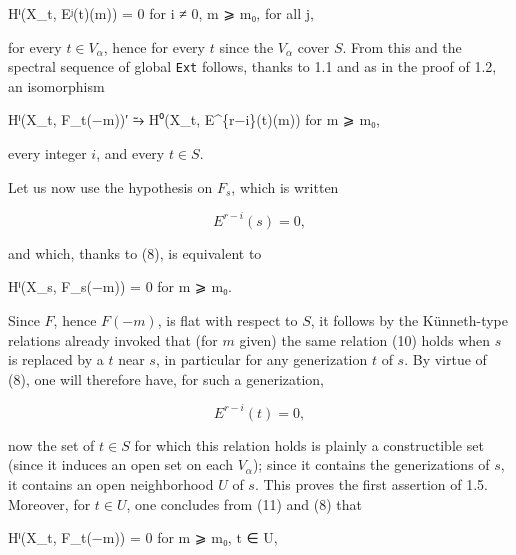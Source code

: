 \documentclass[
]{article}
\newenvironment{Shaded}{}{}
\newcommand{\NormalTok}[1]{#1}
\begin{document}
\begin{Shaded}
\begin{Highlighting}[]
\NormalTok{Hⁱ(X\_t, Eʲ(t)(m)) = 0 for i ≠ 0, m ⩾ m₀, for all j,}
\end{Highlighting}
\end{Shaded}

for every \(t \in V_{\alpha}\), hence for every \(t\) since the
\(V_{\alpha}\) cover \(S\). From this and the spectral sequence of
global \texttt{Ext} follows, thanks to 1.1 and as in the proof of 1.2,
an isomorphism

\begin{Shaded}
\begin{Highlighting}[]
\NormalTok{Hⁱ(X\_t, F\_t(−m))′ ⥲ H⁰(X\_t, E\^{}\{r−i\}(t)(m)) for m ⩾ m₀,}
\end{Highlighting}
\end{Shaded}

every integer \(i\), and every \(t \in S\).

Let us now use the hypothesis on \(F_{s}\), which is written

\[
E^{r-i}(s) = 0,
\]

and which, thanks to (8), is equivalent to

\begin{Shaded}
\begin{Highlighting}[]
\NormalTok{Hⁱ(X\_s, F\_s(−m)) = 0 for m ⩾ m₀.}
\end{Highlighting}
\end{Shaded}

Since \(F\), hence \(F(-m)\), is flat with respect to \(S\), it follows
by the Künneth-type relations already invoked that (for \(m\) given) the
same relation (10) holds when \(s\) is replaced by a \(t\) near \(s\),
in particular for any generization \(t\) of \(s\). By virtue of (8), one
will therefore have, for such a generization,

\[
E^{r-i}(t) = 0,
\]

now the set of \(t \in S\) for which this relation holds is plainly a
constructible set (since it induces an open set on each \(V_{\alpha}\));
since it contains the generizations of \(s\), it contains an open
neighborhood \(U\) of \(s\). This proves the first assertion of 1.5.
Moreover, for \(t \in U\), one concludes from (11) and (8) that

\begin{Shaded}
\begin{Highlighting}[]
\NormalTok{Hⁱ(X\_t, F\_t(−m)) = 0 for m ⩾ m₀, t ∈ U,}
\end{Highlighting}
\end{Shaded}
\end{document}
